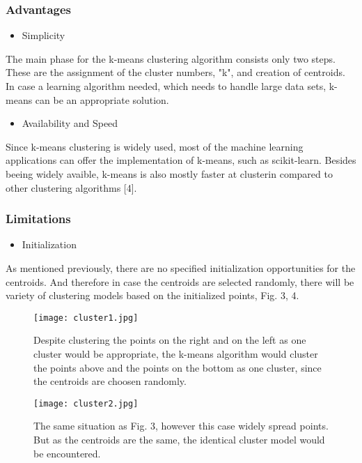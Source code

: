 \documentclass[conference]{IEEEtran}
\begin{document}
\subsubsection{ Advantages }
\begin{itemize}
  \item Simplicity
\end{itemize}

The main phase for the k-means clustering algorithm consists only two steps. These are the assignment of the cluster numbers, "k", and creation of centroids. In case a learning algorithm needed, which needs to handle large data sets, k-means can be an appropriate solution. \\

\begin{itemize}
  \item Availability and Speed
\end{itemize}

Since k-means clustering is widely used, most of the machine learning applications can offer the implementation of k-means, such as scikit-learn. Besides beeing widely avaible, k-means is also mostly faster at clusterin compared to other clustering algorithms [4].\\

\subsubsection{ Limitations }
\begin{itemize}
  \item Initialization
\end{itemize}
As mentioned previously, there are no specified initialization opportunities for the centroids. And therefore in case the centroids are selected randomly, there will be variety of clustering models based on the initialized points, Fig. 3, 4.

\begin{figure}[htbp]
\centerline{\texttt{[image: cluster1.jpg]}}
\caption{Despite clustering the points on the right and on the left as one cluster would be appropriate, the k-means algorithm would cluster the points above and the points on the bottom as one cluster, since the centroids are choosen randomly. }
\label{fig3}
\end{figure}

\begin{figure}[htbp]
\centerline{\texttt{[image: cluster2.jpg]}}
\caption{The same situation as Fig. 3, however this case widely spread points. But as the centroids are the same, the identical cluster model would be encountered.}
\label{fig4}
\end{figure}
\end{document}
